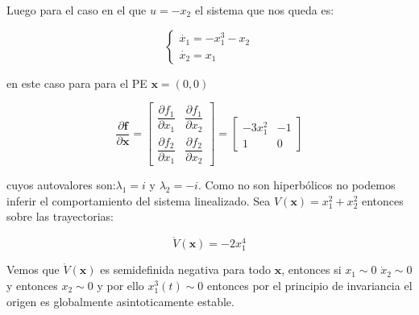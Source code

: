 \documentclass[10pt]{article}
\begin{document}
Luego para el caso en el que $u=-x_{2}$ el sistema que nos queda es:

\begin{equation}
     \label{eq:problema3_2_1}
      \left\{
	       \begin{array}{ll}
               \dot{x_{1}}=-x_{1}^{3}-x_{2}\\[5pt] %
               \dot{x_{2}}=x_{1}
	       \end{array}
	     \right.
\end{equation}

en este caso para para el PE $\mathbf{x} = (0,0)$ 



\begin{equation}
\dfrac{\partial \mathbf{f}}{\partial \mathbf{x}}=
\begin{bmatrix}
 \dfrac{\partial f_1}{\partial x_1}& \dfrac{\partial f_1}{\partial x_2} \\ 
\dfrac{\partial f_2}{\partial x_1}& \dfrac{\partial f_2}{\partial x_2}
\end{bmatrix} 
=
\begin{bmatrix}
    -3x_{1}^{2} & -1\\
1 & 0 
\end{bmatrix}
\label{eq:jaco_sis3}
\end{equation}

cuyos autovalores son:$\lambda_{1}=i$ y $\lambda_{2}=-i$. Como no son hiperbólicos 
no podemos inferir el comportamiento del sistema linealizado. 
Sea $V(\mathbf{x})=x_{1}^{2}+x_{2}^{2}$ entonces sobre las trayectorias:

\begin{equation}
    \dot{V}(\mathbf{x}) = -2x_{1}^{4}
\end{equation}

Vemos que $\dot{V}(\mathbf{x})$ es semidefinida negativa para todo $\mathbf{x}$, entonces si $x_{1} \sim 0$ $\dot{x}_{2} \sim 0$
y entonces $x_{2} \sim 0$ y por ello $x_{1}^{3}(t) \sim 0$ entonces por el principio de invariancia el origen es globalmente asintoticamente estable.

\newpage

\begin{thebibliography}{6}
\end{thebibliography}
\end{document}
